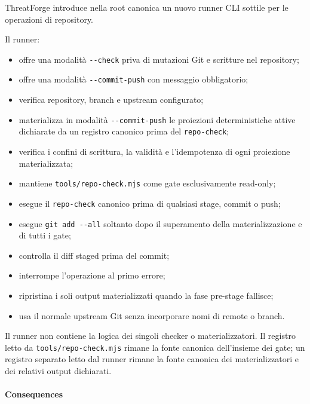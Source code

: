 \documentclass[
  10pt,
]{article}
\providecommand{\tightlist}{%
  \setlength{\itemsep}{0pt}\setlength{\parskip}{0pt}}
\begin{document}
ThreatForge introduce nella root canonica un nuovo runner CLI sottile
per le operazioni di repository.

Il runner:

\begin{itemize}
\tightlist
\item
  offre una modalità \texttt{-\/-check} priva di mutazioni Git e
  scritture nel repository;
\item
  offre una modalità \texttt{-\/-commit-push} con messaggio
  obbligatorio;
\item
  verifica repository, branch e upstream configurato;
\item
  materializza in modalità \texttt{-\/-commit-push} le proiezioni
  deterministiche attive dichiarate da un registro canonico prima del
  \texttt{repo-check};
\item
  verifica i confini di scrittura, la validità e l'idempotenza di ogni
  proiezione materializzata;
\item
  mantiene \texttt{tools/repo-check.mjs} come gate esclusivamente
  read-only;
\item
  esegue il \texttt{repo-check} canonico prima di qualsiasi stage,
  commit o push;
\item
  esegue \texttt{git\ add\ -\/-all} soltanto dopo il superamento della
  materializzazione e di tutti i gate;
\item
  controlla il diff staged prima del commit;
\item
  interrompe l'operazione al primo errore;
\item
  ripristina i soli output materializzati quando la fase pre-stage
  fallisce;
\item
  usa il normale upstream Git senza incorporare nomi di remote o branch.
\end{itemize}

Il runner non contiene la logica dei singoli checker o materializzatori.
Il registro letto da \texttt{tools/repo-check.mjs} rimane la fonte
canonica dell'insieme dei gate; un registro separato letto dal runner
rimane la fonte canonica dei materializzatori e dei relativi output
dichiarati.

\paragraph{Consequences}\label{consequences-20}
\end{document}
